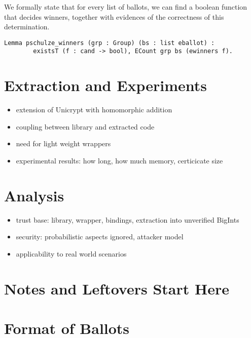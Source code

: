 \documentclass{llncs}
\begin{document}
We formally state that for every list of ballots, we can find a boolean function 
that decides winners, together with evidences of the correctness of this determination.
\begin{verbatim}
Lemma pschulze_winners (grp : Group) (bs : list eballot) :
        existsT (f : cand -> bool), ECount grp bs (ewinners f).
\end{verbatim}






\section{Extraction and Experiments}
\begin{itemize}
  \item extension of Unicrypt with homomorphic addition
  \item coupling between library and extracted code
  \item need for light weight wrappers
  \item experimental results: how long, how much memory, certicicate
  size
\end{itemize}

\section{Analysis}
\begin{itemize}
  \item trust base: library, wrapper, bindings, extraction into
  unverified BigInts
  \item security: probabilistic aspects ignored, attacker model
  \item applicability to real world scenarios
\end{itemize}




\appendix
\section*{Notes and Leftovers Start Here}



\section{Format of Ballots}
\end{document}
